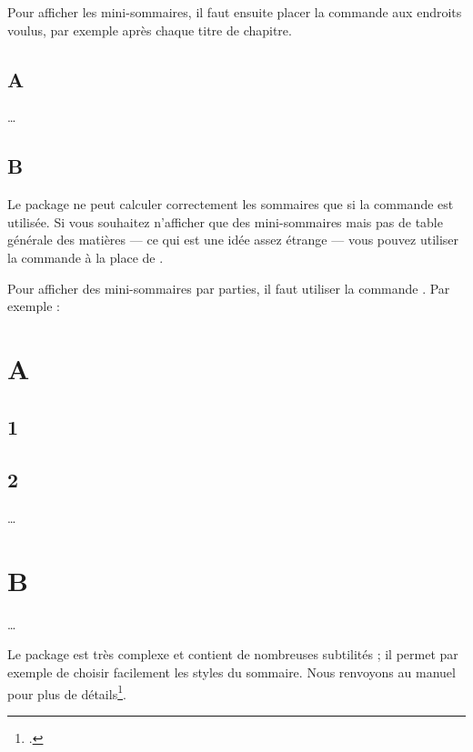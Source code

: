 \begin{latexcode}
\usepackage[french]{minitoc}
\dominitoc
\end{latexcode}

Pour afficher les mini-sommaires, il faut ensuite placer la commande  aux endroits voulus, par exemple après chaque titre de chapitre.

\begin{latexcode}
\chapter{A}
\minitoc
…
\chapter{B}
\minitoc
\end{latexcode}

\begin{attention}
Le package ne peut calculer correctement les sommaires que si la commande  est utilisée. Si vous souhaitez n'afficher que des mini-sommaires mais pas de table générale des matières --- ce qui est une idée assez étrange --- vous pouvez utiliser  la commande  à la place de .
\end{attention}

Pour afficher des mini-sommaires par parties, il faut utiliser la commande . Par exemple :

\begin{latexcode}
\part{A}
\parttoc
\chapter{1}
\chapter{2}
…
\part{B}
\parttoc
…
\end{latexcode}


Le package  est très complexe et contient de nombreuses subtilités ; il permet  par exemple de choisir facilement les styles du sommaire. Nous renvoyons au manuel pour plus de détails\footcite[Notamment][]{minitoc_typesetting}.

